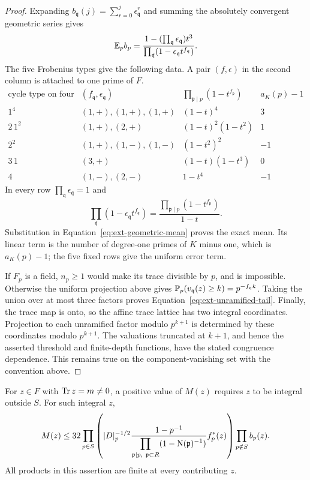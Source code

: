 \begin{proof}
Expanding \(b_{\mathfrak q}(j)=\sum_{r=0}^j\epsilon_{\mathfrak q}^r\)
and summing the absolutely convergent geometric series gives
\begin{equation}
 \E_p b_p=
 \frac{1-(\prod_{\mathfrak q}\epsilon_{\mathfrak q})t^3}
      {\prod_{\mathfrak q}(1-\epsilon_{\mathfrak q}t^{f_{\mathfrak q}})}.
 \label{eq:ext-geometric-mean}
\end{equation}
The five Frobenius types give the following data.  A pair
\((f,\epsilon)\) in the second column is attached to one prime of \(F\).
\[
\begin{array}{c|c|c|c}
 \text{cycle type on four labels}
 & (f_{\mathfrak q},\epsilon_{\mathfrak q})
 & \prod_{\mathfrak p\mid p}(1-t^{f_{\mathfrak p}})
 & a_K(p)-1\\ \hline
 1^4 &(1,+),(1,+),(1,+)&(1-t)^4&3\\
 2\,1^2 &(1,+),(2,+)&(1-t)^2(1-t^2)&1\\
 2^2 &(1,+),(1,-),(1,-)&(1-t^2)^2&-1\\
 3\,1 &(3,+)&(1-t)(1-t^3)&0\\
 4 &(1,-),(2,-)&1-t^4&-1
\end{array}
\]
In every row \(\prod_{\mathfrak q}\epsilon_{\mathfrak q}=1\) and
\[
 \prod_{\mathfrak q}(1-\epsilon_{\mathfrak q}t^{f_{\mathfrak q}})
   =\frac{\prod_{\mathfrak p\mid p}(1-t^{f_{\mathfrak p}})}{1-t}.
\]
Substitution in Equation~\eqref{eq:ext-geometric-mean} proves the exact
mean.  Its linear term is the number of degree-one primes of \(K\)
minus one, which is \(a_K(p)-1\); the five fixed rows give the uniform
error term.

If \(F_p\) is a field, \(n_p\ge1\) would make its trace divisible by
\(p\), and is impossible.  Otherwise the uniform projection above
gives
\(\P_p(v_{\mathfrak q}(z)\ge k)=p^{-f_{\mathfrak q}k}\).
Taking the union over at most three factors proves
Equation~\eqref{eq:ext-unramified-tail}.  Finally, the trace map is
onto, so the affine trace lattice has two integral coordinates.
Projection to each unramified factor modulo \(p^{k+1}\) is determined
by these coordinates modulo \(p^{k+1}\).  The valuations truncated
at \(k+1\), and hence the asserted threshold and finite-depth
functions, have the stated congruence dependence.  This remains true
on the component-vanishing set with the convention above.
\end{proof}

\begin{proposition}
\label{prop:ext-multiplicity-majorant}
For \(z\in F\) with \(\Tr z=m\ne0\), a positive value of \(M(z)\)
requires \(z\) to be integral outside \(S\).  For such integral \(z\),
\begin{equation}
 M(z)\le32
 \prod_{p\in S}
 \left(
 |D|_p^{-1/2}
 \frac{1-p^{-1}}
      {\displaystyle\prod_{\mathfrak p\mid p,\ \mathfrak p\subset R}
                         (1-\Nm(\mathfrak p)^{-1})}
 f_p^*(z)\right)
 \prod_{p\notin S}b_p(z).
 \label{eq:ext-local-majorant}
\end{equation}
All products in this assertion are finite at every contributing \(z\).
\end{proposition}

